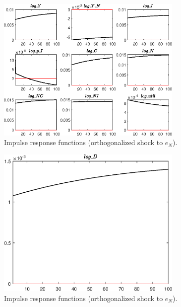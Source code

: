 \begin{figure}[H]
\centering 
\includegraphics[width=0.80\textwidth]{BRS_growth_util/graphs/BRS_growth_util_IRF_e_N2}
\caption{Impulse response functions (orthogonalized shock to ${e_N}$).}\label{Fig:IRF:e_N:2}
\end{figure}
 
\begin{figure}[H]
\centering 
\includegraphics[width=0.80\textwidth]{BRS_growth_util/graphs/BRS_growth_util_IRF_e_N3}
\caption{Impulse response functions (orthogonalized shock to ${e_N}$).}\label{Fig:IRF:e_N:3}
\end{figure}
 
